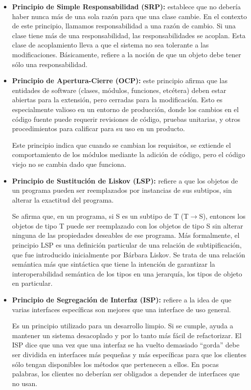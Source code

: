 \begin{itemize}
	\item \textbf{Principio de Simple Responsabilidad (SRP):} establece que no debería haber nunca más de una sola razón para que una clase cambie. En el contexto de este principio, llamamos responsabilidad a una razón de cambio. Si una clase tiene más de una responsabilidad, las responsabilidades se acoplan. Esta clase de acoplamiento lleva a que el sistema no sea tolerante a las modificaciones. Básicamente, refiere a la noción de que un objeto debe tener sólo una responsabilidad.
	
	\item \textbf{Principio de Apertura-Cierre (OCP):} este principio afirma que las entidades de software (clases, módulos, funciones, etcétera) deben estar abiertas para la extensión, pero cerradas para la modificación. Esto es especialmente valioso en un entorno de producción, donde los cambios en el código fuente puede requerir revisiones de código, pruebas unitarias, y otros procedimientos para calificar para su uso en un producto.
	\par Este principio indica que cuando se cambian los requisitos, se extiende el comportamiento de los módulos mediante la adición de código, pero el código viejo no se cambia dado que funciona.

	\item \textbf{Principio de Sustitución de Liskov (LSP):} refiere a que los objetos de un programa pueden ser reemplazados por instancias de sus subtipos, sin alterar la exactitud del programa.
	\par Se afirma que, en un programa, si \textsc{S} es un subtipo de \textsc{T} (\textsc{T}$\to$\textsc{S}), entonces los objetos de tipo \textsc{T} puede ser reemplazado con los objetos de tipo \textsc{S} sin alterar ninguna de las propiedades deseables de ese programa. Más formalmente, el principio LSP es una definición particular de una relación de subtipificación, que fue introducido inicialmente por Bárbara Liskov. Se trata de una relación semántica más que sintáctica que tiene la intención de garantizar la interoperabilidad semántica de los tipos en una jerarquía, los tipos de objeto en particular. 

	\item \textbf{Principio de Segregación de Interfaz (ISP):} refiere a la idea de que varias interfaces específicas son mejores que una interface de uso general.
	\par Es un principio utilizado para un desarrollo limpio. Si se cumple, ayuda a mantener un sistema desacoplado y por lo tanto más fácil de refactorizar. El ISP dice que una vez que una interfaz se ha vuelto demasiado ``gorda'' debe ser dividida en interfaces más pequeñas y más específicas para que los clientes sólo tengan disponibles los métodos que pertenecen a ellos. En pocas palabras, los clientes no deberían ser obligados a depender de interfaces que no usan. 


\end{itemize}
